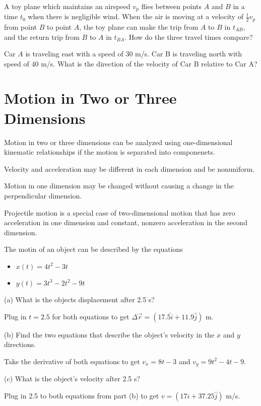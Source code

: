 \documentclass[../mech.tex]{subfiles}
\begin{document}
\ex A toy plane which maintains an airspeed $v_p$ flies between points $A$ and $B$ in a time $t_0$ when there is negligible wind. When the air is moving at a velocity of $\frac{1}{2}v_p$ from 
point $B$ to point $A$, the toy plane can make the trip from $A$ to $B$ in $t_{AB}$, and the return trip from $B$ to $A$ in $t_{BA}$. How do the three travel times compare?

\ex Car $A$ is traveling east with a speed of 30 m/s. Car B is traveling north with speed of 40 m/s. What is the direction of the velocity of Car B relative to Car A?

\section{Motion in Two or Three Dimensions}
Motion in two or three dimensions can be analyzed using one-dimensional kinematic relationships if the motion is separated into componenets.

Velocity and acceleration may be different in each dimension and be nonuniform.

Motion in one dimension may be changed without causing a change in the perpendicular dimension.

Projectile motion is a special case of two-dimensional motion that has zero acceleration in one dimension and constant, nonzero acceleration in the second dimension.

\begin{example}
    The motin of an object can be described by the equations 
    \begin{itemize}
        \item $x(t)=4t^2-3t$
        \item $y(t)=3t^3-2t^2-9t$
    \end{itemize}

    (a) What is the objects displacement after 2.5 s?

    Plug in $t=2.5$ for both equations to get $\Delta \vec{r}=(17.5\hat{i}+11.9\hat{j})$ m.

    (b) Find the two equations that describe the object's velocity in the $x$ and $y$ directions.

    Take the derivative of both equations to get $v_x=8t-3$ and $v_y=9t^2-4t-9$.

    (c) What is the object's velocity after 2.5 s?

    Plug in 2.5 to both equations from part (b) to get $v=(17\hat{i}+37.25\hat{j})$ m/s.
\end{example}
\end{document}
